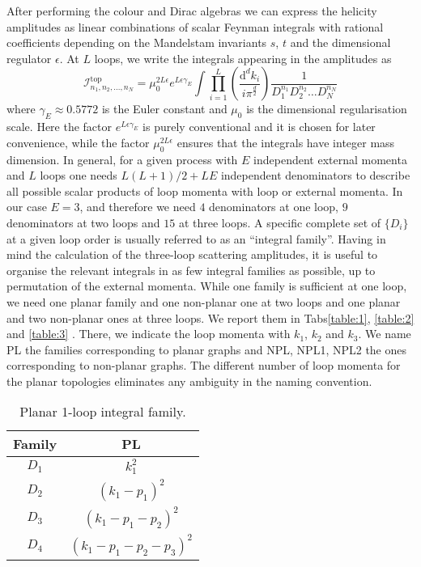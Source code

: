 After performing the colour and Dirac algebras we can express the helicity amplitudes as linear combinations
of scalar Feynman integrals with rational coefficients depending on the Mandelstam invariants $s$,  $t$ and the dimensional
regulator $\epsilon$. 
At $L$ loops, we write the integrals appearing in the amplitudes as
\begin{equation}\label{integrals}
\mathcal{I}^\text{top}_{n_1,n_2,...,n_N} = \mu_0^{2L\epsilon} e^{L \epsilon \gamma_E}  \int \prod_{i=1}^L \left( \frac{\mathrm{d}^d k_i}{i \pi^{\frac{d}{2}}} \right) \frac{1}{D_1^{n_1}D_2^{n_2} \dots D_N^{n_N}}
\end{equation}
where $\gamma_E \approx 0.5772$  is the Euler constant and $\mu_0$ is the dimensional regularisation scale. Here the factor $e^{L \epsilon \gamma_E}$ is purely conventional and it is chosen for later convenience, while the factor $\mu_0^{2L\epsilon}$ ensures that the integrals have integer mass dimension.
In general,  for a given process with $E$ independent external momenta and $L$ loops one needs $L(L+1)/2 + L E $ independent denominators to describe all possible scalar products of loop momenta with loop or external momenta.  
In our case $E=3$, and therefore we need $4$ denominators at one loop,  $9$ denominators at two loops and $15$ 
at three loops. A specific complete set of $\{D_i\}$ at a given loop order
is usually referred to as
an ``integral family''. 
Having in mind the calculation of the three-loop scattering amplitudes, it is useful to organise the relevant integrals 
in as few integral families as possible, up to permutation of the external momenta. 
While one family is sufficient at one loop, we need one planar family and one non-planar one at two loops 
and one
planar and two non-planar ones at three loops. 
We report them in Tabs\eqref{table:1}, \eqref{table:2} and \eqref{table:3} .
There, we indicate the loop momenta with $k_1$, $k_2$ and $k_3$.  We name PL the families corresponding to planar graphs and 
NPL,  NPL1,  NPL2 the ones corresponding to non-planar graphs. 
The different number of loop momenta for the planar topologies eliminates any ambiguity
in the naming convention.

\begin{table}
\centering
\begin{tabular}{ c || c  }
Family & PL \\
\hline\hline
$D_1 $& $k_1^2$  \\ 
$D_2 $& $(k_1 - p_1)^2$  \\  
$D_3 $& $(k_1 - p_1-p_2)^2$    \\
$D_4 $& $(k_1 - p_1-p_2-p_3)^2$  
\end{tabular}
\caption{Planar 1-loop integral family.}
\label{table:1}
\end{table}

